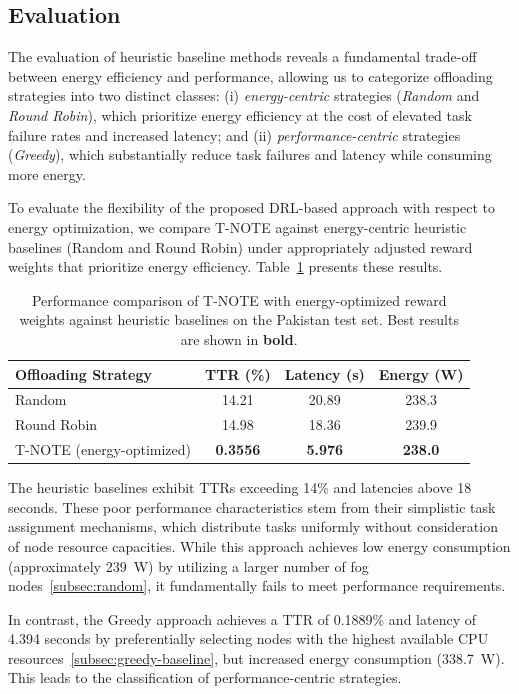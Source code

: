 \documentclass{svproc}
\begin{document}
\subsection{Evaluation}

The evaluation of heuristic baseline methods reveals a fundamental trade-off between energy efficiency and performance, allowing us to categorize offloading strategies into two distinct classes: (i) \emph{energy-centric} strategies (\emph{Random} and \emph{Round Robin}), which prioritize energy efficiency at the cost of elevated task failure rates and increased latency; and (ii) \emph{performance-centric} strategies (\emph{Greedy}), which substantially reduce task failures and latency while consuming more energy.


To evaluate the flexibility of the proposed DRL-based approach with respect to energy optimization, we compare T-NOTE against energy-centric heuristic baselines (Random and Round Robin) under appropriately adjusted reward weights that prioritize energy efficiency. Table~\ref{tab:energy_comparison} presents these results.

\begin{table}[htbp]
\centering
\begin{tabular}{lccc}
\toprule
\textbf{Offloading Strategy} & \textbf{TTR (\%)} & \textbf{Latency (s)} & \textbf{Energy (W)} \\
\midrule
Random 
 & 14.21
 & 20.89
 & 238.3 \\
Round Robin 
 & 14.98
 & 18.36
 & 239.9 \\
\midrule
T-NOTE (energy-optimized)
 & \textbf{0.3556} 
 & \textbf{5.976} 
 & \textbf{238.0} \\
\bottomrule
\end{tabular}
\caption{Performance comparison of T-NOTE with energy-optimized reward weights against heuristic baselines on the Pakistan test set. Best results are shown in \textbf{bold}.}
\label{tab:energy_comparison}
\end{table}

The heuristic baselines exhibit TTRs exceeding 14\% and latencies above 18 seconds. These poor performance characteristics stem from their simplistic task assignment mechanisms, which distribute tasks uniformly without consideration of node resource capacities. While this approach achieves low energy consumption (approximately 239~W) by utilizing a larger number of fog nodes~\ref{subsec:random}, it fundamentally fails to meet performance requirements.

In contrast, the Greedy approach achieves a TTR of 0.1889\% and latency of 4.394 seconds by preferentially selecting nodes with the highest available CPU resources~\ref{subsec:greedy-baseline}, but increased energy consumption (338.7~W). This leads to the classification of performance-centric strategies.
\end{document}
